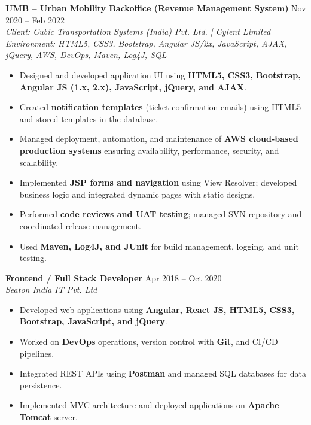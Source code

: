 \documentclass[9.5pt, letterpaper]{article}
\begin{document}
\vspace{2pt}

\textbf{UMB -- Urban Mobility Backoffice (Revenue Management System)} \hfill Nov 2020 -- Feb 2022 \\
\textit{Client: Cubic Transportation Systems (India) Pvt. Ltd. | Cyient Limited} \\
\textit{Environment: HTML5, CSS3, Bootstrap, Angular JS/2x, JavaScript, AJAX, jQuery, AWS, DevOps, Maven, Log4J, SQL}

\begin{itemize}
    \item Designed and developed application UI using \textbf{HTML5, CSS3, Bootstrap, Angular JS (1.x, 2.x), JavaScript, jQuery, and AJAX}.
    \item Created \textbf{notification templates} (ticket confirmation emails) using HTML5 and stored templates in the database.
    \item Managed deployment, automation, and maintenance of \textbf{AWS cloud-based production systems} ensuring availability, performance, security, and scalability.
    \item Implemented \textbf{JSP forms and navigation} using View Resolver; developed business logic and integrated dynamic pages with static designs.
    \item Performed \textbf{code reviews and UAT testing}; managed SVN repository and coordinated release management.
    \item Used \textbf{Maven, Log4J, and JUnit} for build management, logging, and unit testing.
\end{itemize}

\vspace{2pt}

\textbf{Frontend / Full Stack Developer} \hfill Apr 2018 -- Oct 2020 \\
\textit{Seaton India IT Pvt. Ltd}
\begin{itemize}
    \item Developed web applications using \textbf{Angular, React JS, HTML5, CSS3, Bootstrap, JavaScript, and jQuery}.
    \item Worked on \textbf{DevOps} operations, version control with \textbf{Git}, and CI/CD pipelines.
    \item Integrated REST APIs using \textbf{Postman} and managed SQL databases for data persistence.
    \item Implemented MVC architecture and deployed applications on \textbf{Apache Tomcat} server.
\end{itemize}
\end{document}
